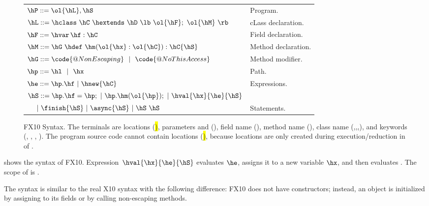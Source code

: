 \begin{figure}[htpb!]
\begin{center}
\begin{tabular}{|l|l|}
\hline

$\hP ::= \ol{\hL},\hS$ & Program. \\

$\hL ::= \hclass ~ \hC~\hextends~\hD~\lb~\ol{\hF};~\ol{\hM}~\rb$
& cLass declaration. \\

$\hF ::= \hvar\,\hf:\hC$
& Field declaration. \\

$\hM ::= \hG\ \hdef\ \hm(\ol{\hx}:\ol{\hC}):\hC\{\hS\}$
& Method declaration. \\

$\hG ::= \code{@NonEscaping} ~~|~~ \code{@NoThisAccess}$
& Method modifier. \\

$\hp ::= \hl ~~|~~ \hx$
& Path. \\ %

$\he ::=  \hp.\hf  ~|~ \hnew{\hC}$
& Expressions. \\ %

$\hS ::=  \hp.\hf = \hp; ~|~ \hp.\hm(\ol{\hp});  ~|~ \hval{\hx}{\he}{\hS}$ &\\
$~~~~|~ \finish{\hS}~|~ \async{\hS} ~|~ \hS~\hS$
& Statements. \\ %

\hline
\end{tabular}
\end{center}
\caption{FX10 Syntax.
    The terminals are locations (\hl), parameters and \hthis (\hx), field name (\hf), method name (\hm), class name (\hB,\hC,\hD,\hObject),
        and keywords (\hhnew, \hfinish, \hasync, ).
    The program source code cannot contain locations (\hl), because locations are only created during execution/reduction in  of .
    }
\label{Figure:syntax}
\end{figure}

 shows the syntax of FX10.
Expression~$\hval{\hx}{\he}{\hS}$ evaluates $\he$, assigns it to a
new variable $\hx$, and then evaluates \hS. The scope of \hx{} is \hS.

The syntax is similar to the real X10 syntax with the following difference:
FX10 does not have constructors; instead, an object is initialized by assigning to its fields or
    by calling
    non-escaping methods.

